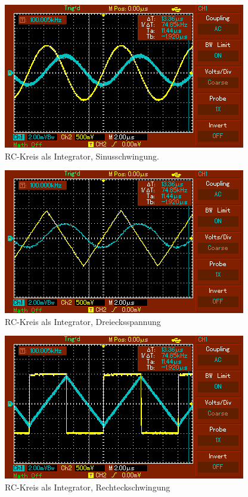 \begin{figure}[h!]
  \centering
  \includegraphics[scale = 0.6]{Bild2.png}
  \caption{RC-Kreis als Integrator, Sinusschwingung.}
  \label{Integrator1}
\end{figure}

\begin{figure}[h!]
  \centering
  \includegraphics[scale = 0.6]{Bild4.png}
  \caption{RC-Kreis als Integrator, Dreiecksspannung}
  \label{Integrator2}
\end{figure}

\begin{figure}[h!]
  \centering
  \includegraphics[scale = 0.6]{Bild5.png}
  \caption{RC-Kreis als Integrator, Rechteckschwingung}
  \label{Integrator3}
\end{figure}

